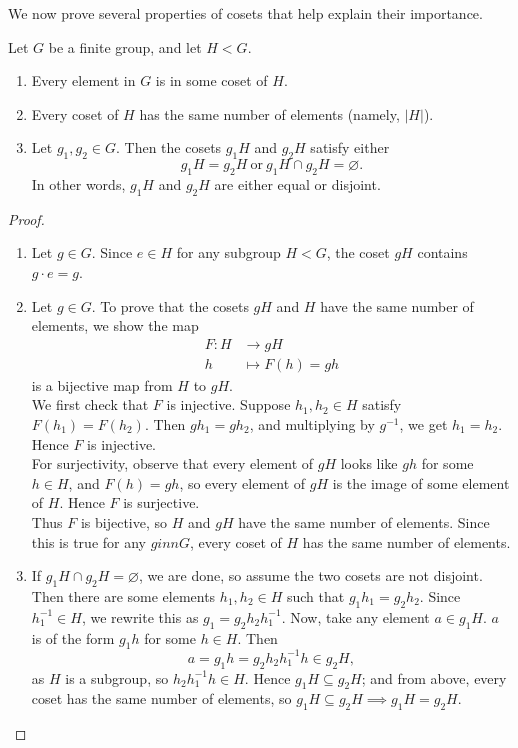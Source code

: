 \documentclass[math1530-lecture-notes]{subfiles}
\begin{document}
We now prove several properties of cosets that help explain their importance.
\begin{proposition}{}
  Let $G$ be a finite group, and let $H<G$.
  \begin{enumerate}
    \item Every element in $G$ is in some coset of $H$.
    \item Every coset of $H$ has the same number of elements (namely, $\left| H \right| $).
    \item Let $g_1,g_2\in G$. Then the cosets $g_1H$ and $ g_2H$ satisfy either \[
      g_1H=g_2H ~\text{or}~g_1H\cap g_2H=\varnothing
    .\] In other words, $g_1H$ and $g_2H$ are either equal or disjoint.
  \end{enumerate}
\end{proposition}
\begin{proof}[Proof]
  \begin{enumerate}
    \item Let $g\in G$. Since $e\in H$ for any subgroup $H<G$, the coset $gH$ contains $g\cdot e=g$.
    \item Let $g\in G$. To prove that the cosets $gH$ and $H$ have the same number of elements, we
      show the map \begin{align*}
        F: H &\longrightarrow gH \\
        h &\longmapsto F(h) = gh
      \end{align*}
      is a bijective map from $H$ to $gH$.\\
      We first check that $F$ is injective. Suppose $h_1,h_2\in H$ satisfy $F(h_1)=F(h_2)$. Then
      $gh_1=gh_2$, and multiplying by $g^{-1}$, we get $h_1=h_2$. Hence $F$ is injective.\\
      For surjectivity, observe that every element of $gH$ looks like $gh$ for some $h\in H$, and
      $F(h)=gh$, so every element of $gH$ is the image of some element of $H$. Hence $F$ is
      surjective.\\
      Thus $F$ is bijective, so $H$ and $gH$ have the same number of elements. Since this is true
      for any $ginnG$, every coset of $H$ has the same number of elements.
    \item If $g_1H\cap g_2H=\varnothing$, we are done, so assume the two cosets are not disjoint.
      Then there are some elements $h_1,h_2\in H$ such that $g_1h_1=g_2h_2$. Since $h_1^{-1}\in H$,
      we rewrite this as $ g_1=g_2h_2h_1^{-1}$. Now, take any element $a\in g_1H$. $a$ is of the
      form $g_1h$ for some $h\in H$. Then \[
        a = g_1h = g_2h_2h_1^{-1}h \in g_2H
      ,\] as $H$ is a subgroup, so $h_2h_1^{-1}h\in H$. Hence $g_1H\subseteq g_2H$; and from above,
      every coset has the same number of elements, so $ g_1H\subseteq g_2H \implies g_1H=g_2H$.
  \end{enumerate}
\end{proof}
\end{document}
